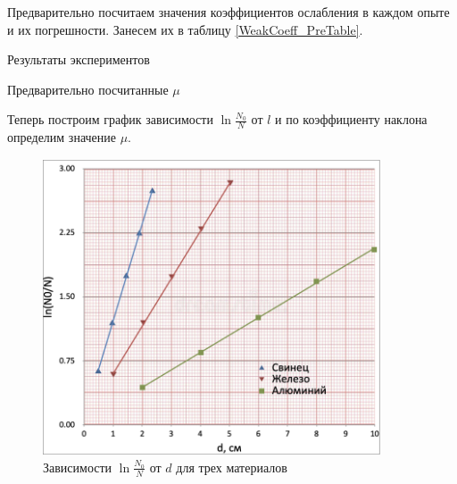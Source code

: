 \documentclass[12pt,a4paper]{article}
\begin{document}
\begin{enumerate}
		Предварительно посчитаем значения коэффициентов ослабления в каждом опыте и их погрешности. Занесем их в таблицу \ref{WeakCoeff_PreTable}.

        \begin{table}[h!]
           \centering
           \footnotesize
           
    	   \caption{Результаты экспериментов}
    	   \label{WeakCoeff_Table}
        \end{table}

        \begin{table}[h!]
		    \centering
            
		    \caption{Предварительно посчитанные $\mu$}
		    \label{WeakCoeff_PreTable}
	   \end{table}
	
	\end{enumerate}	

	\newpage
	Теперь построим график зависимости $\ln \frac{N_0}{N}$ от $l$ и по коэффициенту наклона определим значение $\mu$.
	
	\begin{figure}[h!]
		\centering
		\includegraphics[width=10cm]{src/plot.png}
		\caption{Зависимости $\ln \frac{N_0}{N}$ от $d$ для трех материалов}
	\end{figure}
\end{document}
